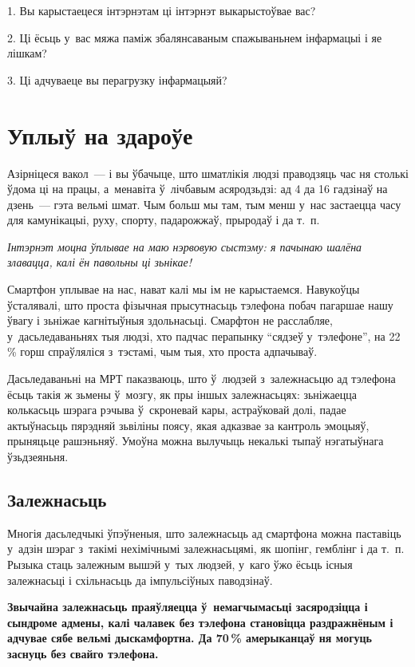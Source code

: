 1. Вы карыстаецеся інтэрнэтам ці інтэрнэт выкарыстоўвае вас?

2. Ці ёсьць у~вас мяжа паміж збалянсаваным спажываньнем інфармацыі і яе лішкам?

3. Ці адчуваеце вы перагрузку інфармацыяй?


\section{Уплыў на здароўе}

Азірніцеся вакол~--- і вы ўбачыце, што шматлікія людзі праводзяць час ня столькі ўдома ці на працы, а~менавіта ў~лічбавым асяродзьдзі: ад 4 да 16 гадзінаў на дзень~--- гэта вельмі шмат. Чым больш мы там, тым менш у~нас застаецца часу для камунікацыі, руху, спорту, падарожжаў, прыродаў і да т.~п.

\emph{Інтэрнэт моцна ўплывае на маю нэрвовую сыстэму: я пачынаю шалёна злавацца, калі ён павольны ці зьнікае!}

Смартфон уплывае на нас, нават калі мы ім не карыстаемся. Навукоўцы ўсталявалі, што проста фізычная прысутнасьць тэлефона побач пагаршае нашу ўвагу і зьніжае кагнітыўныя здольнасьці. Смарфтон не расслабляе, у~дасьледаваньнях тыя людзі, хто падчас перапынку ``сядзеў у~тэлефоне'', на 22\,\% горш спраўляліся з~тэстамі, чым тыя, хто проста адпачываў.

Дасьледаваньні на МРТ паказваюць, што ў~людзей з~залежнасьцю ад тэлефона ёсьць такія ж зьмены ў~мозгу, як пры іншых залежнасьцях: зьніжаецца колькасьць шэрага рэчыва ў~скроневай кары, астраўковай долі, падае актыўнасьць пярэдняй зьвіліны поясу, якая адказвае за кантроль эмоцыяў, прыняцьце рашэньняў. Умоўна можна вылучыць некалькі тыпаў нэгатыўнага ўзьдзеяньня.

\subsection*{Залежнасьць}

Многія дасьледчыкі ўпэўненыя, што залежнасьць ад смартфона можна паставіць у~адзін шэраг з~такімі нехімічнымі залежнасьцямі, як шопінг, гемблінг і да т.~п. Рызыка стаць залежным вышэй у~тых людзей, у~каго ўжо ёсьць існыя залежнасьці і схільнасьць да імпульсіўных паводзінаў.

\textbf{Звычайна залежнасьць праяўляецца ў~немагчымасьці засяродзіцца і сындроме адмены, калі чалавек без тэлефона становіцца раздражнёным і адчувае сябе вельмі дыскамфортна. Да 70\,\% амерыканцаў ня могуць заснуць без свайго тэлефона.} 

